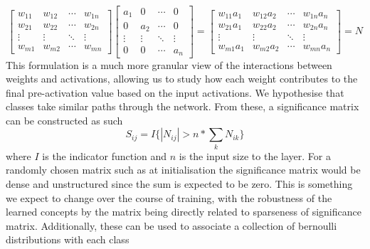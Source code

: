 \documentclass{article}
\begin{document}
            \[
                \begin{bmatrix}
                    w_{11} & w_{12} & \cdots & w_{1n} \\
                    w_{21} & w_{22} & \cdots & w_{2n} \\
                    \vdots & \vdots & \ddots & \vdots \\
                    w_{m1} & w_{m2} & \cdots & w_{mn}
                \end{bmatrix}
                \begin{bmatrix}
                    a_{1} & 0 & \cdots & 0 \\
                    0 & a_2 & \cdots & 0 \\
                    \vdots & \vdots & \ddots & \vdots \\
                    0 & 0 & \cdots & a_{n}
                \end{bmatrix}
                =
                \begin{bmatrix}
                    w_{11} a_1 & w_{12} a_2 & \cdots & w_{1n} a_n \\
                    w_{21} a_1 & w_{22} a_2 & \cdots & w_{2n} a_n \\
                    \vdots & \vdots & \ddots & \vdots \\
                    w_{m1} a_1 & w_{m2} a_2 & \cdots & w_{mn} a_n
                \end{bmatrix} = N
            \]
            This formulation is a much more granular view of the interactions between weights and activations, allowing us to study how each weight contributes to the final pre-activation value based on the input activations. We hypothesise that classes take similar paths through the network. From these, a significance matrix can be constructed as such 
            \[
                S_{ij} = I \{|N_{ij}| > n * \sum_{k} N_{ik}\}
            \]
            where $I$ is the indicator function and $n$ is the input size to the layer. For a randomly chosen matrix such as at initialisation the significance matrix would be dense and unstructured since the sum is expected to be zero. This is something we expect to change over the course of training, with the robustness of the learned concepts by the matrix being directly related to sparseness of significance matrix. Additionally, these can be used to associate a collection of bernoulli distributions with each class 
\end{document}
